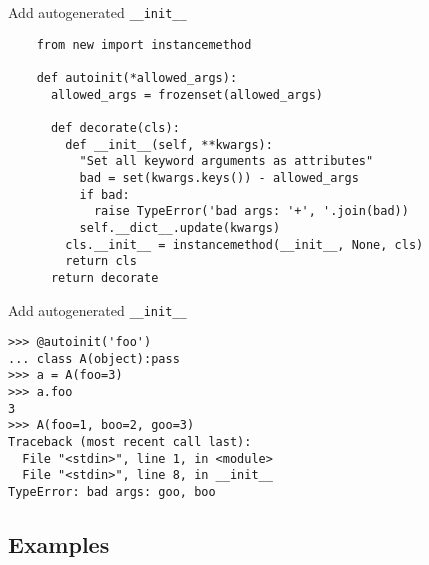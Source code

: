 \documentclass{beamer}
\begin{document}
\begin{frame}[fragile]{Add autogenerated \texttt{\_\_init\_\_}}
  \begin{verbatim}
    from new import instancemethod

    def autoinit(*allowed_args):
      allowed_args = frozenset(allowed_args)

      def decorate(cls):
        def __init__(self, **kwargs):
          "Set all keyword arguments as attributes"
          bad = set(kwargs.keys()) - allowed_args
          if bad:
            raise TypeError('bad args: '+', '.join(bad))
          self.__dict__.update(kwargs)
        cls.__init__ = instancemethod(__init__, None, cls)
        return cls
      return decorate
  \end{verbatim}
\end{frame}

\begin{frame}[fragile]{Add autogenerated \texttt{\_\_init\_\_}}
  \begin{verbatim}
>>> @autoinit('foo')
... class A(object):pass
>>> a = A(foo=3)
>>> a.foo
3
>>> A(foo=1, boo=2, goo=3)
Traceback (most recent call last):
  File "<stdin>", line 1, in <module>
  File "<stdin>", line 8, in __init__
TypeError: bad args: goo, boo
  \end{verbatim}
\end{frame}

\subsection{Examples}
\end{document}

